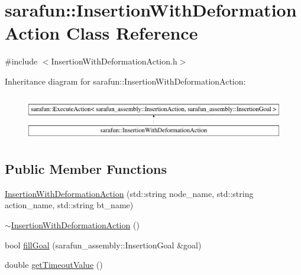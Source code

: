 \hypertarget{classsarafun_1_1InsertionWithDeformationAction}{\section{sarafun\-:\-:Insertion\-With\-Deformation\-Action Class Reference}
\label{classsarafun_1_1InsertionWithDeformationAction}
}


{\ttfamily \#include $<$Insertion\-With\-Deformation\-Action.\-h$>$}

Inheritance diagram for sarafun\-:\-:Insertion\-With\-Deformation\-Action\-:\begin{figure}[H]
\begin{center}
\leavevmode
\includegraphics[height=2.000000cm]{classsarafun_1_1InsertionWithDeformationAction}
\end{center}
\end{figure}
\subsection*{Public Member Functions}
\begin{DoxyCompactItemize}
\item 
\hyperlink{classsarafun_1_1InsertionWithDeformationAction_a2b851f2604c6a10f32b1d4b51bfae6a8}{Insertion\-With\-Deformation\-Action} (std\-::string node\-\_\-name, std\-::string action\-\_\-name, std\-::string bt\-\_\-name)
\item 
\hyperlink{classsarafun_1_1InsertionWithDeformationAction_a9b8740951e51538bf47d6534b8b4fe36}{$\sim$\-Insertion\-With\-Deformation\-Action} ()
\item 
bool \hyperlink{classsarafun_1_1InsertionWithDeformationAction_a32d695dfcd626c5a7ca0fa987c245083}{fill\-Goal} (sarafun\-\_\-assembly\-::\-Insertion\-Goal \&goal)
\item 
double \hyperlink{classsarafun_1_1InsertionWithDeformationAction_a8d77b104fb2396000b273cb6754ff879}{get\-Timeout\-Value} ()
\end{DoxyCompactItemize}


